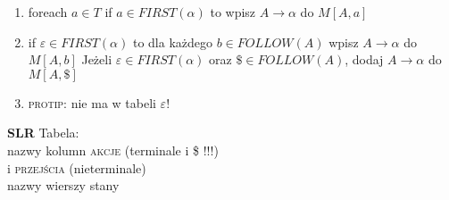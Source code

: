 \begin{multicols}{3}
\begin{enumerate}
      \item foreach $a \in T$ if $a \in FIRST(\alpha)$ to wpisz $A\rightarrow \alpha$ do $M[A,a]$
      \item if $\varepsilon \in FIRST(\alpha)$ to dla każdego $b \in FOLLOW(A)$ wpisz $A\rightarrow \alpha$ do $M[A,b]$  Jeżeli $ \varepsilon  \in FIRST(\alpha)$ oraz $ \$ \in FOLLOW(A) $, dodaj $A \rightarrow \alpha $ do $M[A, \$]$ 
      \item \textsc{protip}: nie ma w tabeli $\varepsilon$!
    \end{enumerate}
    \textbf{SLR}
    Tabela:\\ nazwy kolumn \textsc{akcje} (terminale i \$ !!!) \\i \textsc{przejścia} (nieterminale) \\ nazwy wierszy stany 
    

\end{multicols}
